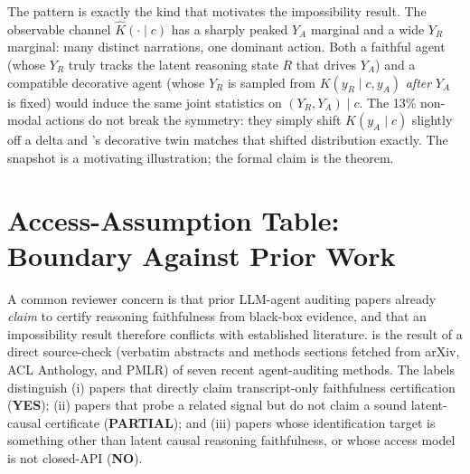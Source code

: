 \documentclass{article}
\theoremstyle{plain}
\theoremstyle{definition}
\theoremstyle{remark}
\begin{document}
The pattern is exactly the kind that motivates the impossibility result. The
observable channel $\hat K(\cdot \mid c)$ has a sharply peaked $Y_A$ marginal
and a wide $Y_R$ marginal: many distinct narrations, one dominant action.
Both a faithful agent (whose $Y_R$ truly tracks the latent reasoning state
$R$ that drives $Y_A$) and a compatible decorative agent (whose $Y_R$ is
sampled from $K(y_R \mid c, y_A)$ \emph{after} $Y_A$ is fixed) would induce
the same joint statistics on $(Y_R, Y_A) \mid c$. The 13\% non-modal actions
do not break the symmetry: they simply shift $K(y_A \mid c)$ slightly off a
delta and 's decorative twin matches that
shifted distribution exactly. The snapshot is a motivating illustration; the
formal claim is the theorem.

\section{Access-Assumption Table: Boundary Against Prior Work}\label{sec:access-table}

A common reviewer concern is that prior LLM-agent auditing papers already
\emph{claim} to certify reasoning faithfulness from black-box evidence, and
that an impossibility result therefore conflicts with established literature.
 is the result of a direct source-check (verbatim
abstracts and methods sections fetched from arXiv, ACL Anthology, and PMLR)
of seven recent agent-auditing methods. The labels distinguish (i) papers
that directly claim transcript-only faithfulness certification (\textbf{YES});
(ii) papers that probe a related signal but do not claim a sound latent-causal
certificate (\textbf{PARTIAL}); and (iii) papers whose identification target
is something other than latent causal reasoning faithfulness, or whose access
model is not closed-API (\textbf{NO}).
\end{document}
